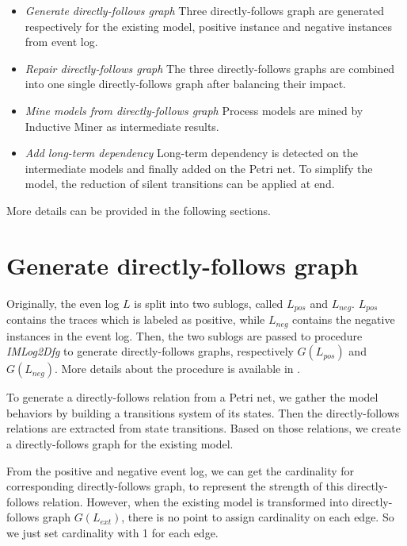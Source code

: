 \begin{itemize}
	\item \emph{Generate directly-follows graph}\quad 
	Three directly-follows graph are generated respectively for the existing model, positive instance and negative instances from event log.
	\item \emph{Repair directly-follows graph} \quad
	The three directly-follows graphs are combined into one single directly-follows graph after balancing their impact.
	\item \emph{Mine models from directly-follows graph} \quad
	Process models are mined by Inductive Miner as intermediate results.
	\item \emph{Add long-term dependency} \quad
	Long-term dependency is detected on the intermediate models and finally added on the Petri net. To simplify the model, the reduction of silent transitions can be applied at end.
\end{itemize}
More details can be provided in the following sections.

\section{Generate directly-follows graph}
Originally, the even log $L$ is split into two sublogs, called $L_{pos}$ and $L_{neg}$. $L_{pos}$ contains the traces which is labeled as positive, while $L_{neg}$ contains the negative instances in the event log. Then, the two sublogs are passed to procedure \emph{IMLog2Dfg} to generate directly-follows graphs, respectively $G(L_{pos})$ and $G(L_{neg})$. More details about the procedure is available in \cite{leemans2013discovering}. 

To generate a directly-follows relation from  a Petri net, we gather the model behaviors by building a transitions system of its states. Then the directly-follows relations are extracted from state transitions. Based on those relations, we create a directly-follows graph for the existing model.

From the positive and negative event log, we can get the cardinality for corresponding directly-follows graph, to represent the strength of this directly-follows relation. However, when the existing model is transformed into  directly-follows graph $G(L_{ext})$, there is no point to assign cardinality on each edge. So we just set cardinality with 1 for each edge. 
